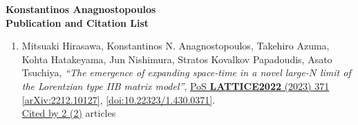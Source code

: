 \documentclass[a4paper,10pt]{article}
\begin{document}
\begin{center}
{\Large\bf Konstantinos Anagnostopoulos}\\
{\large\bf Publication and Citation List}
\end  {center}
\begin{enumerate}
\item Mitsuaki Hirasawa, Konstantinos N. Anagnostopoulos, Takehiro Azuma, Kohta Hatakeyama, Jun Nishimura, Stratos Kovalkov Papadoudis, Asato Tsuchiya, {\it ``The emergence of expanding space-time in a novel large-$N$ limit of the Lorentzian type IIB matrix model''}, \href{https://www.doi.org/10.22323/1.430.0371}{PoS {\bf LATTICE2022} (2023) 371} \href{https://arxiv.org/abs/2212.10127}{[arXiv:2212.10127]}, \href{https://www.doi.org/10.22323/1.430.0371}{[doi:10.22323/1.430.0371]}.
\\\href{https://inspirehep.net/literature/?q=refersto%3Arecid%3A2616279}{Cited by 2 (2)} articles


\end{enumerate}
\end{document}

